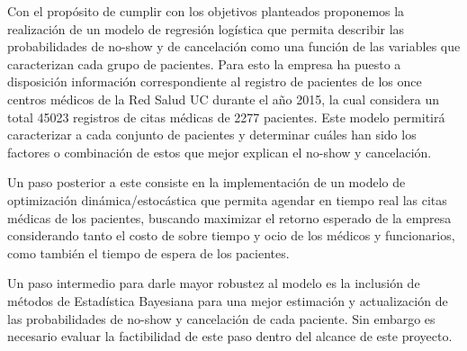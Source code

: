 Con el propósito de cumplir con los objetivos planteados proponemos la realización de un modelo de regresión logística que permita describir las probabilidades de no-show y de cancelación como una función de las variables que caracterizan cada grupo de pacientes. Para esto la empresa ha puesto a disposición información correspondiente al registro de pacientes de los once centros médicos de la Red Salud UC durante el año 2015, la cual considera un total 45023 registros de citas médicas de 2277 pacientes. Este modelo permitirá caracterizar a cada conjunto de pacientes y determinar cuáles han sido los factores o combinación de estos que mejor explican el no-show y cancelación.

Un paso posterior a este consiste en la implementación de un modelo de optimización dinámica/estocástica que permita agendar en tiempo real las citas médicas de los pacientes, buscando maximizar el retorno esperado de la empresa considerando tanto el costo de sobre tiempo y ocio de los médicos y funcionarios, como también el tiempo de espera de los pacientes.

Un paso intermedio para darle mayor robustez al modelo es la inclusión de métodos de Estadística Bayesiana para una mejor estimación y actualización de las probabilidades de no-show y cancelación de cada paciente. Sin embargo es necesario evaluar la factibilidad de este paso dentro del alcance de este proyecto.
